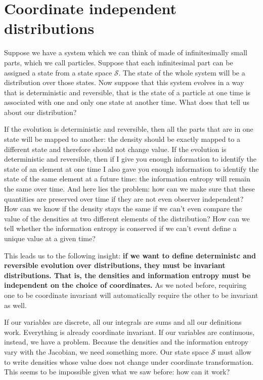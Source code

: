 \documentclass[11pt]{article}
\begin{document}
\section{Coordinate independent distributions}

Suppose we have a system which we can think of made of infinitesimally small parts, which we call particles. Suppose  that each infinitesimal part can be assigned a state from a state space $\mathcal{S}$. The state of the whole system will be a distribution over those states. Now suppose that this system evolves in a way that is deterministic and reversible, that is the state of a particle at one time is associated with one and only one state at another time. What does that tell us about our distribution?

If the evolution is deterministic and reversible, then all the parts that are in one state will be mapped to another: the density should be exactly mapped to a different state and therefore should not change value. If the evolution is deterministic and reversible, then if I give you enough information to identify the state of an element at one time I also gave you enough information to identify the state of the same element at a future time: the information entropy will remain the same over time. And here lies the problem: how can we make sure that these quantities are preserved over time if they are not even observer independent? How can we know if the density stays the same if we can't even compare the value of the densities at two different elements of the distribution? How can we tell whether the information entropy is conserved if we can't event define a unique value at a given time?

This leads us to the following insight: \textbf{if we want to define deterministc and reversible evolution over distributions, they must be invariant distributions. That is, the densities and information entropy must be independent on the choice of coordinates.} As we noted before, requiring one to be coordinate invariant will automatically require the other to be invariant as well.

If our variables are discrete, all our integrals are sums and all our definitions work. Everything is already coordinate invariant. If our variables are continuous, instead, we have a problem. Because the densities and the information entropy vary with the Jacobian, we need something more. Our state space $\mathcal{S}$ must allow to write densities whose value does not change under coordinate transformation. This seems to be impossible given what we saw before: how can it work?
\end{document}
